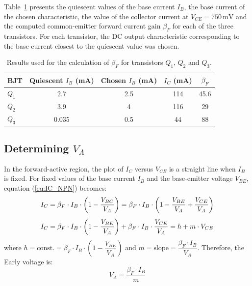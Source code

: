 \documentclass[12pt,a4paper]{article}
\begin{document}
Table~\ref{tab:beta} presents the quiescent values of the base current $I_B$, the base current
of the chosen characteristic, the value of the collector current at $V_{CE} = 750\,\text{mV}$
and the computed common-emitter forward current gain $\beta_F$ for each of the three transistors.
For each transistor, the DC output characteristic corresponding to the base current closest to the
quiescent value was chosen.

\begin{table}[H]
    \centering
    \begin{tabular}{lcccc}
        \toprule
        BJT & Quiescent $I_B$ (mA) & Chosen $I_B$ (mA) & $I_C$ (mA) & $\beta_F$ \\
        \midrule
        $Q_1$ & 2.7   & 2.5 & 114& 45.6\\
        $Q_2$ & 3.9   & 4   & 116& 29\\
        $Q_3$ & 0.035 & 0.5 & 44& 88\\
        \bottomrule
    \end{tabular}
    \caption{Results used for the calculation of $\beta_F$ for transistors $Q_1$, $Q_2$ and $Q_3$.}
    \label{tab:beta}
\end{table}

\subsection{Determining $V_A$}

In the forward-active region, the plot of $I_C$ versus $V_{CE}$ is a straight line when $I_B$
is fixed. For fixed values of the base current $I_B$ and the base-emitter voltage $V_{BE}$,
equation (\ref{eq:IC_NPN}) becomes:
\begin{align}
    I_C &= \beta_F \cdot I_B \cdot \left(1 - \frac{V_{BC}}{V_A}\right)
         = \beta_F \cdot I_B \cdot \left(1 - \frac{V_{BE}}{V_A} + \frac{V_{CE}}{V_A}\right)
         \notag \\[4pt]
    I_C &= \beta_F \cdot I_B \cdot \left(1 - \frac{V_{BE}}{V_A}\right)
         + \beta_F \cdot I_B \cdot \frac{V_{CE}}{V_A}
         = h + m \cdot V_{CE}
    \label{eq:VA_derivation}
\end{align}
where $h = \mathrm{const.} = \beta_F \cdot I_B \cdot \left(1 - \dfrac{V_{BE}}{V_A}\right)$ and
$m = \mathrm{slope} = \dfrac{\beta_F \cdot I_B}{V_A}$.
Therefore, the Early voltage is:
\begin{equation}
    V_A = \frac{\beta_F \cdot I_B}{m}
    \label{eq:VA}
\end{equation}
\end{document}
